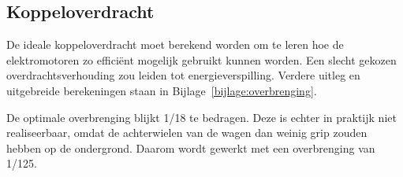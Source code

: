 \subsection{Koppeloverdracht}

De ideale koppeloverdracht moet berekend worden om te leren hoe de elektromotoren zo efficiënt mogelijk gebruikt kunnen worden. Een slecht gekozen overdrachtsverhouding zou leiden tot energieverspilling.
Verdere uitleg en uitgebreide berekeningen staan in Bijlage~\ref{bijlage:overbrenging}.

De optimale overbrenging blijkt 1/18 te bedragen. Deze is echter in praktijk niet realiseerbaar, omdat de achterwielen van de wagen dan weinig grip zouden hebben op de ondergrond. Daarom wordt gewerkt met een overbrenging van 1/125.